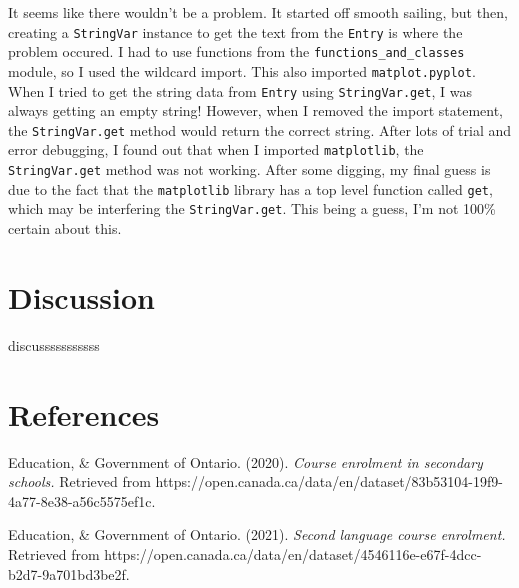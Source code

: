 \documentclass[fontsize=11pt]{article}
\begin{document}
It seems like there wouldn't be a problem. It started off smooth sailing, but then, creating a \texttt{StringVar} instance
to get the text from the \texttt{Entry} is where the problem occured. 
I had to use functions from the \texttt{functions\_and\_classes} module, so I used the wildcard import.
This also imported \texttt{matplot.pyplot}.
When I tried to get the string data from \texttt{Entry} using \texttt{StringVar.get}, I was always getting an empty string!
However, when I removed the import statement, the \texttt{StringVar.get} method would return the correct string.
After lots of trial and error debugging, I found out that when I imported \texttt{matplotlib},
the \texttt{StringVar.get} method was not working.
After some digging, my final guess is due to the fact that the \texttt{matplotlib} library has
a top level function called \texttt{get}, which may be interfering the \texttt{StringVar.get}.
This being a guess, I'm not 100\% certain about this.

\section*{Discussion}

discusssssssssss

\section*{References}

\noindent Education, \& Government of Ontario. (2020). \emph{Course enrolment in secondary schools.} Retrieved from \linebreak \indent https://open.canada.ca/data/en/dataset/83b53104-19f9-4a77-8e38-a56c5575ef1c.

\noindent Education, \& Government of Ontario. (2021). \emph{Second language course enrolment.} Retrieved from \linebreak \indent https://open.canada.ca/data/en/dataset/4546116e-e67f-4dcc-b2d7-9a701bd3be2f. 

\end{document}
